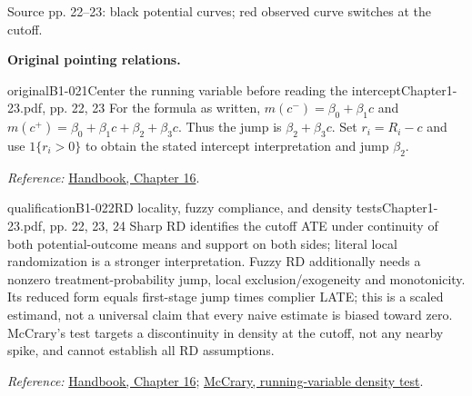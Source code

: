 {\begin{center}
\begin{tikzpicture}[>=Stealth, font=\small, line width=.65pt]
\end{tikzpicture}
\par{\small Source pp. 22--23: black potential curves; red observed curve switches at the cutoff.}
\end{center}
\par{}\smallskip\textbf{Original pointing relations.}\par\smallskip
{}
\begin{reviewnote}{original}{B1-021}{Center the running variable before reading the intercept}{Chapter1-23.pdf, pp. 22, 23}
For the formula as written, $m(c^-)=\beta_0+\beta_1c$ and $m(c^+)=\beta_0+\beta_1c+\beta_2+\beta_3c$. Thus the jump is $\beta_2+\beta_3c$. Set $r_i=R_i-c$ and use $1\{r_i>0\}$ to obtain the stated intercept interpretation and jump $\beta_2$.
\par\smallskip\textit{Reference:} \href{https://matheusfacure.github.io/python-causality-handbook/16-Regression-Discontinuity-Design.html}{Handbook, Chapter 16}.
\end{reviewnote}

\begin{reviewnote}{qualification}{B1-022}{RD locality, fuzzy compliance, and density tests}{Chapter1-23.pdf, pp. 22, 23, 24}
Sharp RD identifies the cutoff ATE under continuity of both potential-outcome means and support on both sides; literal local randomization is a stronger interpretation. Fuzzy RD additionally needs a nonzero treatment-probability jump, local exclusion/exogeneity and monotonicity. Its reduced form equals first-stage jump times complier LATE; this is a scaled estimand, not a universal claim that every naive estimate is biased toward zero. McCrary's test targets a discontinuity in density at the cutoff, not any nearby spike, and cannot establish all RD assumptions.
\par\smallskip\textit{Reference:} \href{https://matheusfacure.github.io/python-causality-handbook/16-Regression-Discontinuity-Design.html}{Handbook, Chapter 16}; \href{https://www.nber.org/papers/t0334}{McCrary, running-variable density test}.
\end{reviewnote}

}
